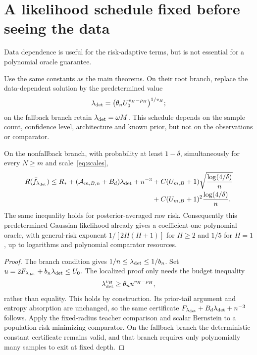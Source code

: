 \appendix
\section{A likelihood schedule fixed before seeing the data}
\label{sec:fixed-calibration}
Data dependence is useful for the risk-adaptive terms, but is not essential for a polynomial oracle guarantee.

\begin{corollary}
\label{cor:deterministic}
Use the same constants as the main theorems. On their root branch, replace the data-dependent solution by the predetermined value
\[
 \lambda_{\rm det}
   =\bigl(\theta_n U_0^{v_H-\rho_H}\bigr)^{1/v_H};
\]
on the fallback branch retain $\lambda_{\rm det}=\omega M$.
This schedule depends on the sample count, confidence level, architecture and known prior, but not on the observations or comparator.

On the nonfallback branch, with probability at least $1-\delta$,
simultaneously for every $N\ge m$ and scale~\eqref{eq:scales},
\begin{align*}
 R(\bar f_{\lambda_{\rm det}})
 \le R_*+(\mathcal A_{m,B,n}+B_d)\lambda_{\rm det}+n^{-3}
 &+C(U_{m,B}+1)\sqrt{\frac{\log(4/\delta)}n}\\
 &+C(U_{m,B}+1)^2\frac{\log(4/\delta)}n.
\end{align*}
The same inequality holds for posterior-averaged raw risk.
Consequently this predetermined Gaussian likelihood already gives a
coefficient-one polynomial oracle, with general-risk exponent
$1/[2H(H+1)]$ for $H\ge2$ and $1/5$ for $H=1$, up to logarithms and
polynomial comparator resources.
\end{corollary}
\begin{proof}
The branch condition gives $1/n\le\lambda_{\rm det}\le1/b_n$.
Set $u=2F_{\lambda_{\rm det}}+b_n\lambda_{\rm det}\le U_0$.
The localized proof only needs the budget inequality
\[
 \lambda_{\rm det}^{v_H}
 \ge\theta_n u^{v_H-\rho_H},
\]
rather than equality. This holds by construction. Its prior-tail argument
and entropy absorption are unchanged, so the same certificate
$F_{\lambda_{\rm det}}+B_d\lambda_{\rm det}+n^{-3}$ follows.
Apply the fixed-radius teacher comparison and scalar Bernstein to a
population-risk-minimizing comparator. On the fallback branch the
deterministic constant certificate remains valid, and that branch
requires only polynomially many samples to exit at fixed depth.
\end{proof}

